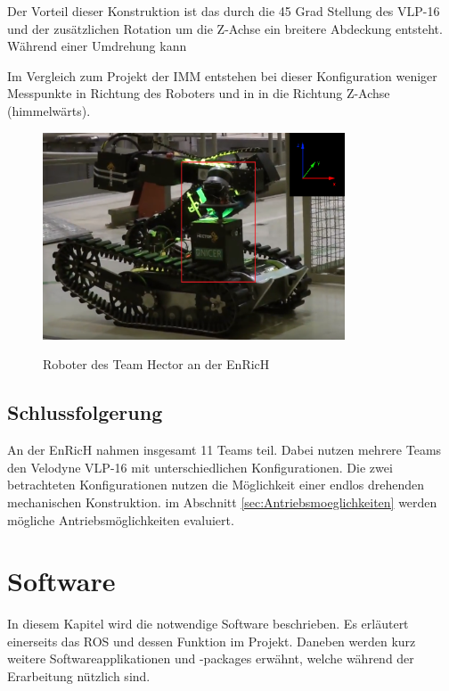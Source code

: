 Der Vorteil dieser Konstruktion ist das durch die 45 Grad Stellung des VLP-16 und der zusätzlichen Rotation um die Z-Achse ein breitere Abdeckung entsteht. Während einer Umdrehung kann 

Im Vergleich zum Projekt der IMM entstehen bei dieser Konfiguration weniger Messpunkte in Richtung des Roboters und in in die Richtung Z-Achse (himmelwärts).



\begin{figure}[H]
	\centering
	\includegraphics[width=0.8\textwidth]
	{resources/hector.PNG}
	\caption[Roboter des Team Hector EnRicH]{Roboter des Team Hector an der EnRicH} \protect\cite{velodyne}
	\label{fig:hector}
\end{figure}


 	
  \subsection{Schlussfolgerung}
  An der EnRicH nahmen insgesamt 11 Teams teil. Dabei nutzen mehrere Teams den Velodyne VLP-16 mit unterschiedlichen Konfigurationen. Die zwei betrachteten Konfigurationen nutzen die Möglichkeit einer endlos drehenden mechanischen Konstruktion. im Abschnitt \ref{sec:Antriebsmoeglichkeiten} werden mögliche Antriebsmöglichkeiten evaluiert.
  
 

\section{Software}
\label{sec:Software}
In diesem Kapitel wird die notwendige Software beschrieben. Es erläutert einerseits das \ac{ROS} und dessen Funktion im Projekt. Daneben werden kurz weitere Softwareapplikationen und -packages erwähnt, welche während der Erarbeitung nützlich sind.

